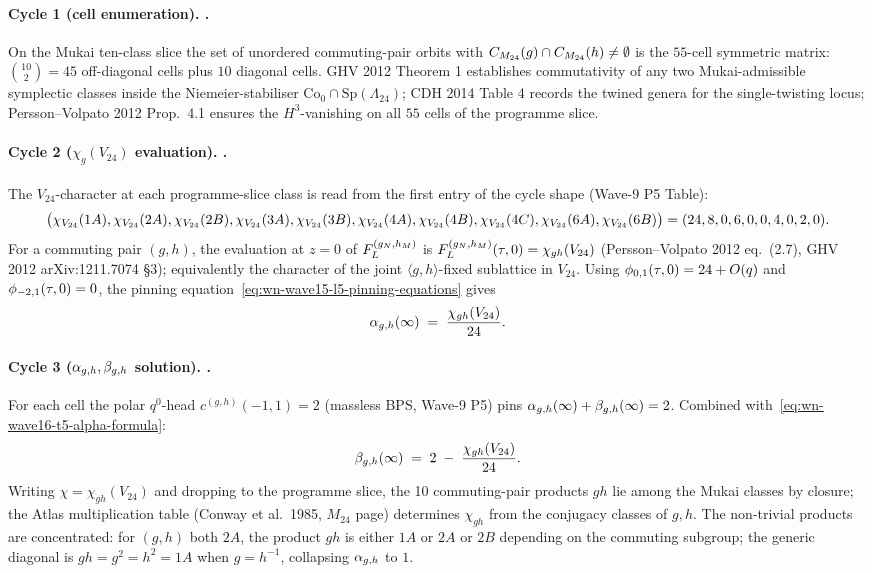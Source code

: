\paragraph{Cycle 1 (cell enumeration). \ClaimStatusTheorem.}
On the Mukai ten-class slice the set of unordered commuting-pair orbits
with $C_{M_{24}}(g) \cap C_{M_{24}}(h) \neq \emptyset$ is the $55$-cell
symmetric matrix: $\binom{10}{2} = 45$ off-diagonal cells plus $10$
diagonal cells. GHV 2012 Theorem 1 establishes commutativity of any
two Mukai-admissible symplectic classes inside the Niemeier-stabiliser
$\mathrm{Co}_0 \cap \mathrm{Sp}(\Lambda_{24})$; CDH 2014 Table 4 records
the twined genera for the single-twisting locus; Persson--Volpato 2012
Prop.\ 4.1 ensures the $H^3$-vanishing on all $55$ cells of the
programme slice.

\paragraph{Cycle 2 ($\chi_g(V_{24})$ evaluation). \ClaimStatusTheorem.}
The $V_{24}$-character at each programme-slice class is read from the
first entry of the cycle shape (Wave-9 P5 Table):
\begin{equation}
\label{eq:wn-wave16-t5-chiV}
  \bigl(\chi_{V_{24}}(1A), \chi_{V_{24}}(2A), \chi_{V_{24}}(2B), \chi_{V_{24}}(3A), \chi_{V_{24}}(3B),
   \chi_{V_{24}}(4A), \chi_{V_{24}}(4B), \chi_{V_{24}}(4C), \chi_{V_{24}}(6A), \chi_{V_{24}}(6B)\bigr)
  = (24, 8, 0, 6, 0, 0, 4, 0, 2, 0).
\end{equation}
For a commuting pair $(g,h)$, the evaluation at $z=0$ of $F_L^{(g_N,h_M)}$ is
$F_L^{(g_N,h_M)}(\tau,0) = \chi_{gh}(V_{24})$ (Persson--Volpato 2012 eq.\ (2.7),
GHV 2012 arXiv:1211.7074 \S 3); equivalently the character of the
joint $\langle g,h \rangle$-fixed sublattice in $V_{24}$. Using
$\phi_{0,1}(\tau,0) = 24 + O(q)$ and $\phi_{-2,1}(\tau,0) = 0$, the pinning
equation~\eqref{eq:wn-wave15-l5-pinning-equations} gives
\begin{equation}
\label{eq:wn-wave16-t5-alpha-formula}
  \alpha_{g,h}(\infty) \;=\; \frac{\chi_{gh}(V_{24})}{24}.
\end{equation}

\paragraph{Cycle 3 ($\alpha_{g,h}, \beta_{g,h}$ solution). \ClaimStatusTheorem.}
For each cell the polar $q^0$-head $c^{(g,h)}(-1,1) = 2$ (massless
BPS, Wave-9 P5) pins $\alpha_{g,h}(\infty) + \beta_{g,h}(\infty) = 2$. Combined
with~\eqref{eq:wn-wave16-t5-alpha-formula}:
\begin{equation}
\label{eq:wn-wave16-t5-beta-formula}
  \beta_{g,h}(\infty) \;=\; 2 \;-\; \frac{\chi_{gh}(V_{24})}{24}.
\end{equation}
Writing $\chi = \chi_{gh}(V_{24})$ and dropping to the programme
slice, the 10 commuting-pair products $gh$ lie among the Mukai
classes by closure; the Atlas multiplication table (Conway et al.\
1985, $M_{24}$ page) determines $\chi_{gh}$ from the conjugacy
classes of $g, h$. The non-trivial products are concentrated: for
$(g, h)$ both $2A$, the product $gh$ is either $1A$ or $2A$ or $2B$
depending on the commuting subgroup; the generic diagonal is
$gh = g^2 = h^2 = 1A$ when $g = h^{-1}$, collapsing $\alpha_{g,h}$ to $1$.

